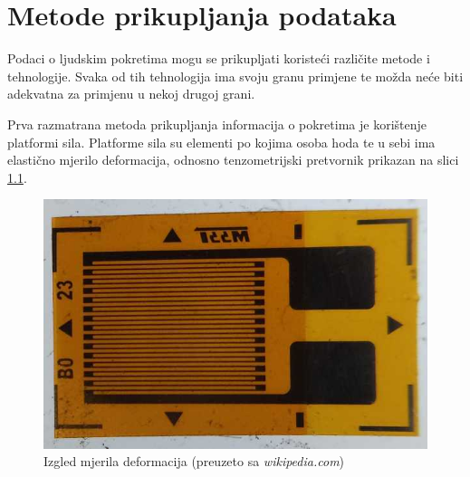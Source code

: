 \documentclass[times, utf8, diplomski]{fer}
\begin{document}
\chapter{Metode prikupljanja podataka}
Podaci o ljudskim pokretima mogu se prikupljati koristeći različite metode i tehnologije.
Svaka od tih tehnologija ima svoju granu primjene te možda neće biti adekvatna za primjenu u nekoj drugoj grani.

Prva razmatrana metoda prikupljanja informacija o pokretima je korištenje platformi sila. Platforme sila su elementi po kojima osoba
hoda te u sebi ima elastično mjerilo deformacija, odnosno tenzometrijski pretvornik prikazan na slici \ref{defgag}. 

\begin{figure}[h!]
    \includegraphics[width=\textwidth]{strain_gauge.jpg}
    \caption{Izgled mjerila deformacija (preuzeto sa \textit{wikipedia.com})}
    \label{defgag}
\end{figure}
\end{document}
